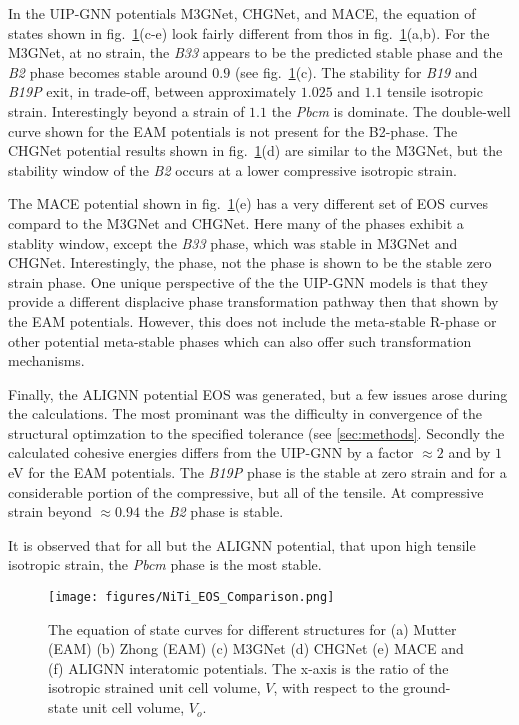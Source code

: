 \documentclass[preprint]{elsarticle}
\begin{document}
In the UIP-GNN potentials M3GNet, CHGNet, and MACE, the equation of states shown in fig.~\ref{fig:eos}(c-e) look fairly different from thos in fig.~\ref{fig:eos}(a,b). For the M3GNet,  at no strain, the \textit{B33} appears to be the predicted stable phase and the \textit{B2} phase becomes stable around $0.9$ (see fig.~\ref{fig:eos}(c). The stability for \textit{B19} and \textit{B19P} exit, in trade-off, between approximately $1.025$ and $1.1$ tensile isotropic strain. Interestingly beyond a strain of $1.1$ the \textit{Pbcm} is dominate. The double-well curve shown for the EAM potentials is not present for the B2-phase. The CHGNet potential results shown in fig.~\ref{fig:eos}(d) are similar to the M3GNet, but the stability window of the \textit{B2} occurs at a lower compressive isotropic strain. \par

The MACE potential shown in fig.~\ref{fig:eos}(e) has a very different set of EOS curves compard to the M3GNet and CHGNet. Here many of the phases exhibit a stablity window, except the \textit{B33} phase, which was stable in M3GNet and CHGNet. Interestingly, the  phase, not the  phase is shown to be the stable zero strain phase. One unique perspective of the the UIP-GNN models is that they provide a different displacive phase transformation pathway then that shown by the EAM potentials. However, this does not include the meta-stable R-phase or other potential meta-stable phases which can also offer such transformation mechanisms. \par


Finally, the ALIGNN potential EOS was generated, but a few issues arose during the calculations. The most prominant was the difficulty in convergence of the structural optimzation to the specified tolerance (see \ref{sec:methods}. Secondly the calculated cohesive energies differs from the UIP-GNN by a factor $\approx 2$ and by $1$ eV for the EAM potentials. The \textit{B19P} phase is the stable at zero strain and for a considerable portion of the compressive, but all of the tensile. At compressive strain beyond $\approx 0.94$ the \textit{B2} phase is stable. 

It is observed that for all but the ALIGNN potential, that upon high tensile isotropic strain, the \textit{Pbcm} phase is the most stable. \par

\begin{figure}[ht!]
    \begin{centering}
        \texttt{[image: figures/NiTi\_EOS\_Comparison.png]}
        \caption{
            The equation of state curves for different  structures for (a) Mutter (EAM) (b) Zhong (EAM) (c) M3GNet (d) CHGNet (e) MACE and (f) ALIGNN interatomic potentials. The x-axis is the ratio of the isotropic strained unit cell volume, $V$,  with respect to the ground-state unit cell volume, $V_o$.
        }
        \label{fig:eos}
    \end{centering}
\end{figure}
\end{document}
